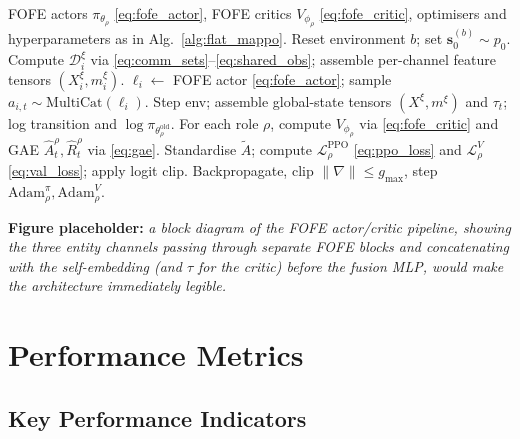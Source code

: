 \begin{algorithm}[H]
\caption{FOFE-MAPPO (one training iteration).}
\label{alg:fofe_mappo}
\begin{algorithmic}[1]
\Require FOFE actors $\pi_{\theta_\rho}$ \eqref{eq:fofe_actor}, FOFE critics
  $V_{\phi_\rho}$ \eqref{eq:fofe_critic}, optimisers and hyperparameters as in
  Alg.~\ref{alg:flat_mappo}.
  \State Reset environment $b$; set $\mathbf{s}^{(b)}_0\sim p_0$.
    \State Compute $\mathcal{D}_i^{\xi}$ via \eqref{eq:comm_sets}--\eqref{eq:shared_obs};
      assemble per-channel feature tensors
      $(X_i^{\xi},m_i^{\xi})$.
    \State $\boldsymbol{\ell}_i \leftarrow$ FOFE actor \eqref{eq:fofe_actor};
      sample $a_{i,t}\sim\mathrm{MultiCat}(\boldsymbol{\ell}_i)$.
    \State Step env; assemble global-state tensors $(X^{\xi},m^{\xi})$ and
      $\tau_t$; log transition and $\log\pi_{\theta_\rho^{\mathrm{old}}}$.
  \EndFor
\EndFor
\State For each role $\rho$, compute $V_{\phi_\rho}$ via \eqref{eq:fofe_critic}
  and GAE $\hat A_t^\rho,\hat R_t^\rho$ via \eqref{eq:gae}.
    \State Standardise $\tilde A$; compute $\mathcal{L}^{\mathrm{PPO}}_{\rho}$
      \eqref{eq:ppo_loss} and $\mathcal{L}^{V}_{\rho}$ \eqref{eq:val_loss};
      apply logit clip.
    \State Backpropagate, clip $\|\nabla\|\le g_{\max}$, step
      $\mathrm{Adam}_\rho^{\pi},\mathrm{Adam}_\rho^{V}$.
  \EndFor
\EndFor
\end{algorithmic}
\end{algorithm}

\textbf{Figure placeholder:} \emph{a block diagram of the FOFE actor/critic
pipeline, showing the three entity channels passing through separate FOFE
blocks and concatenating with the self-embedding (and $\tau$ for the critic)
before the fusion MLP, would make the architecture immediately legible.}

\section{Performance Metrics}
\label{sec:kpis}

\subsection{Key Performance Indicators}
\label{sec:kpi_list}

